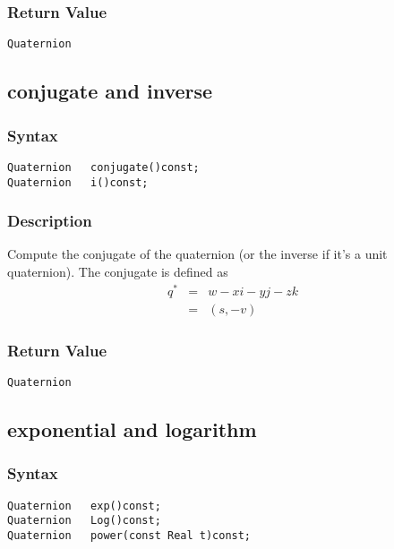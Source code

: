 \documentclass[11pt,fleqn,letterpaper]{report}
\begin{document}
\subsubsection*{Return Value}

{\tt Quaternion}

\newpage

\subsection*{conjugate and inverse}

\subsubsection*{Syntax}
\begin{verbatim}
Quaternion   conjugate()const;
Quaternion   i()const;
\end{verbatim}
\subsubsection{Description}
Compute the conjugate of the quaternion (or the inverse if it's a
unit quaternion). The conjugate is defined as
\begin{eqnarray}
 q^{*} & = & w - xi - yj - zk \\
       & = & (s,-v)
\end{eqnarray}

\subsubsection*{Return Value}

{\tt Quaternion}

\newpage

\subsection*{exponential and logarithm}

\subsubsection*{Syntax}
\begin{verbatim}
Quaternion   exp()const;
Quaternion   Log()const;
Quaternion   power(const Real t)const;
\end{verbatim}
\end{document}
